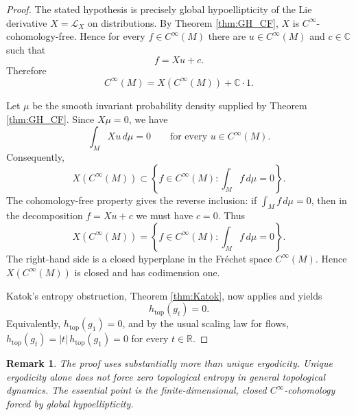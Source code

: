 \documentclass[11pt]{article}
\newtheorem{remark}{Remark}
\newcommand{\Lie}{\mathcal L}
\newcommand{\R}{\mathbb R}
\newcommand{\C}{\mathbb C}
\newcommand{\htop}{h_{\mathrm{top}}}
\begin{document}
\begin{proof}
The stated hypothesis is precisely global hypoellipticity of the Lie derivative
\(X=\Lie_X\) on distributions.  By Theorem \ref{thm:GH_CF}, \(X\) is
\(C^\infty\)-cohomology-free.  Hence for every \(f\in C^\infty(M)\) there are
\(u\in C^\infty(M)\) and \(c\in\C\) such that
\[
        f=Xu+c .
\]
Therefore
\[
        C^\infty(M)=X(C^\infty(M))+\C\cdot 1 .
\]

Let \(\mu\) be the smooth invariant probability density supplied by
Theorem \ref{thm:GH_CF}.  Since \(X\mu=0\), we have
\[
        \int_M Xu\,d\mu=0
        \qquad\text{for every }u\in C^\infty(M).
\]
Consequently,
\[
        X(C^\infty(M))\subset
        \left\{f\in C^\infty(M):\int_M f\,d\mu=0\right\}.
\]
The cohomology-free property gives the reverse inclusion: if
\(\int_M f\,d\mu=0\), then in the decomposition \(f=Xu+c\) we must have
\(c=0\).  Thus
\[
        X(C^\infty(M))
        =
        \left\{f\in C^\infty(M):\int_M f\,d\mu=0\right\}.
\]
The right-hand side is a closed hyperplane in the Fr\'echet space
\(C^\infty(M)\).  Hence \(X(C^\infty(M))\) is closed and has codimension one.

Katok's entropy obstruction, Theorem \ref{thm:Katok}, now applies and yields
\[
        \htop(g_t)=0.
\]
Equivalently, \(\htop(g_1)=0\), and by the usual scaling law for flows,
\(\htop(g_t)=|t|\,\htop(g_1)=0\) for every \(t\in\R\).
\end{proof}

\begin{remark}
The proof uses substantially more than unique ergodicity.  Unique ergodicity
alone does not force zero topological entropy in general topological dynamics.
The essential point is the finite-dimensional, closed \(C^\infty\)-cohomology
forced by global hypoellipticity.
\end{remark}
\end{document}
